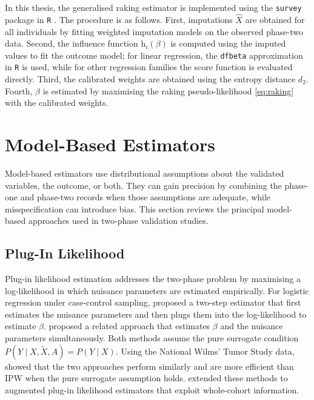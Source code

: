In this thesis, the generalised raking estimator is implemented using the \texttt{survey} package \citep{lumley2011complex} in \texttt{R} \citep{r2025}. The procedure is as follows. First, imputations $\hat{X}$ are obtained for all individuals by fitting weighted imputation models on the observed phase-two data. Second, the influence function $\mathrm{h}_i(\beta)$ is computed using the imputed values to fit the outcome model; for linear regression, the \texttt{dfbeta} approximation in \texttt{R} is used, while for other regression families the score function is evaluated directly. Third, the calibrated weights are obtained using the entropy distance $d_2$. Fourth, $\beta$ is estimated by maximising the raking pseudo-likelihood \eqref{eq:raking} with the calibrated weights.


\section{Model-Based Estimators}
\label{sec:model_based}

Model-based estimators use distributional assumptions about the validated variables, the outcome, or both. They can gain precision by combining the phase-one and phase-two records when those assumptions are adequate, while misspecification can introduce bias. This section reviews the principal model-based approaches used in two-phase validation studies.

\subsection{Plug-In Likelihood}
\label{sec:plugin}

Plug-in likelihood estimation addresses the two-phase problem by maximising a log-likelihood in which nuisance parameters are estimated empirically. For logistic regression under case-control sampling, \citet{breslow1988logistic} proposed a two-step estimator that first estimates the nuisance parameters and then plugs them into the log-likelihood to estimate $\beta$. \citet{schill1993logistic} proposed a related approach that estimates $\beta$ and the nuisance parameters simultaneously. Both methods assume the pure surrogate condition $P(Y \mid X, \tilde{X}, A) = P(Y \mid X)$. Using the National Wilms' Tumor Study data, \citet{breslow1999design} showed that the two approaches perform similarly and are more efficient than IPW when the pure surrogate assumption holds. \citet{rivera2020augmented} extended these methods to augmented plug-in likelihood estimators that exploit whole-cohort information.

